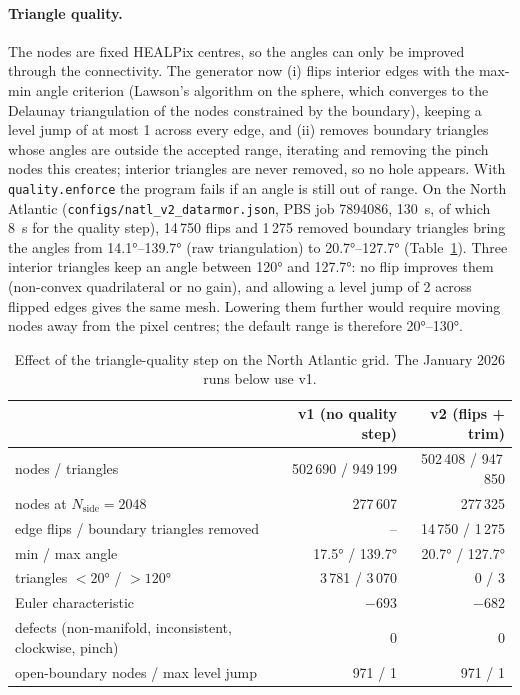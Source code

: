 \documentclass[11pt,a4paper]{article}
\newcommand{\nside}{N_{\mathrm{side}}}
\begin{document}
\paragraph{Triangle quality.} The nodes are fixed HEALPix centres, so the
angles can only be improved through the connectivity. The generator now
(i) flips interior edges with the max-min angle criterion (Lawson's
algorithm on the sphere, which converges to the Delaunay triangulation of
the nodes constrained by the boundary), keeping a level jump of at most 1
across every edge, and (ii) removes boundary triangles whose angles are
outside the accepted range, iterating and removing the pinch nodes this
creates; interior triangles are never removed, so no hole appears. With
\texttt{quality.enforce} the program fails if an angle is still out of
range. On the North Atlantic (\texttt{configs/natl\_v2\_datarmor.json},
PBS job 7894086, \SI{130}{s}, of which \SI{8}{s} for the quality step),
14\,750 flips and 1\,275 removed boundary triangles bring the angles from
\ang{14.1}--\ang{139.7} (raw triangulation) to \ang{20.7}--\ang{127.7}
(Table~\ref{tab:quality}). Three interior triangles keep an angle between
\ang{120} and \ang{127.7}: no flip improves them (non-convex quadrilateral
or no gain), and allowing a level jump of 2 across flipped edges gives the
same mesh. Lowering them further would require moving nodes away from the
pixel centres; the default range is therefore \ang{20}--\ang{130}.

\begin{table}[H]
\centering
\begin{tabular}{lrr}
\toprule
 & v1 (no quality step) & v2 (flips + trim) \\
\midrule
nodes / triangles & 502\,690 / 949\,199 & 502\,408 / 947\,850 \\
nodes at $\nside=2048$ & 277\,607 & 277\,325 \\
edge flips / boundary triangles removed & -- & 14\,750 / 1\,275 \\
min / max angle & \ang{17.5} / \ang{139.7} & \ang{20.7} / \ang{127.7} \\
triangles $<\ang{20}$ / $>\ang{120}$ & 3\,781 / 3\,070 & 0 / 3 \\
Euler characteristic & $-693$ & $-682$ \\
defects (non-manifold, inconsistent, clockwise, pinch) & 0 & 0 \\
open-boundary nodes / max level jump & 971 / 1 & 971 / 1 \\
\bottomrule
\end{tabular}
\caption{Effect of the triangle-quality step on the North Atlantic grid.
The January 2026 runs below use v1.}
\label{tab:quality}
\end{table}
\end{document}
